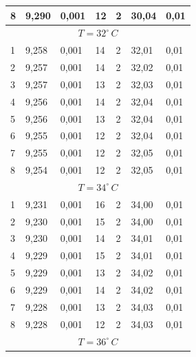 \documentclass[10pt,a4paper]{article}
\begin{document}
\begin{longtable}[h!]{|l|l|l|l|l|l|l|}
8 & 9,290  & 0,001 & 12 & 2                      & 30,04 & 0,01                      \\ \hline
\multicolumn{7}{|c|}{$T = 32^{\circ}\,C$}                                            \\ \hline
1 & 9,258  & 0,001 & 14 & 2                      & 32,01 & 0,01                      \\ \hline
2 & 9,257  & 0,001 & 14 & 2                      & 32,02 & 0,01                      \\ \hline
3 & 9,257  & 0,001 & 13 & 2                      & 32,03 & 0,01                      \\ \hline
4 & 9,256  & 0,001 & 14 & 2                      & 32,04 & 0,01                      \\ \hline
5 & 9,256  & 0,001 & 13 & 2                      & 32,04 & 0,01                      \\ \hline
6 & 9,255  & 0,001 & 12 & 2                      & 32,04 & 0,01                      \\ \hline
7 & 9,255  & 0,001 & 12 & 2                      & 32,05 & 0,01                      \\ \hline
8 & 9,254  & 0,001 & 12 & 2                      & 32,05 & 0,01                      \\ \hline
\multicolumn{7}{|c|}{$T = 34^{\circ}\,C$}                                            \\ \hline
1 & 9,231  & 0,001 & 16 & 2                      & 34,00 & 0,01                      \\ \hline
2 & 9,230  & 0,001 & 15 & 2                      & 34,00 & 0,01                      \\ \hline
3 & 9,230  & 0,001 & 14 & 2                      & 34,01 & 0,01                      \\ \hline
4 & 9,229  & 0,001 & 15 & 2                      & 34,01 & 0,01                      \\ \hline
5 & 9,229  & 0,001 & 13 & 2                      & 34,02 & 0,01                      \\ \hline
6 & 9,229  & 0,001 & 14 & 2                      & 34,02 & 0,01                      \\ \hline
7 & 9,228  & 0,001 & 13 & 2                      & 34,03 & 0,01                      \\ \hline
8 & 9,228  & 0,001 & 12 & 2                      & 34,03 & 0,01                      \\ \hline
\multicolumn{7}{|c|}{$T = 36^{\circ}\,C$}                                            \\ \hline

\end{longtable}
\end{document}
